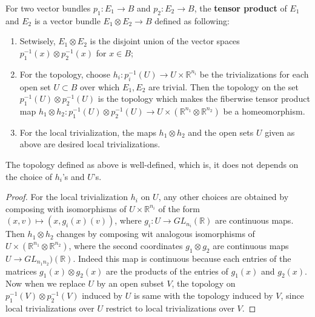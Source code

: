 \begin{defn} For two vector bundles $p_1:E_1\rightarrow B$ and $p_2:E_2\rightarrow B$, the \textbf{tensor product} of $E_1$ and $E_2$ is a vector bundle $E_1\otimes E_2\rightarrow B$ defined as following:
\begin{enumerate}
\item Setwisely, $E_1\otimes E_2$ is the disjoint union of the vector spaces $p_1^{-1}(x)\otimes p_2^{-1}(x)$ for $x\in B$;
\item For the topology, choose $h_i:p_i^{-1}(U)\rightarrow U\times \mathbb{R}^{n_i}$ be the trivializations for each open set $U\subset B$ over which $E_1, E_2$ are trivial. Then the topology on the set $p_1^{-1}(U)\otimes p_2^{-1}(U)$ is the topology which makes the fiberwise tensor product map $h_1\otimes h_2:p_1^{-1}(U)\otimes p_2^{-1}(U)\rightarrow U\times(\mathbb{R}^{n_1}\otimes \mathbb{R}^{n_2})$ be a homeomorphism.
\item For the local trivialization, the maps $h_1\otimes h_2$ and the open sets $U$ given as above are desired local trivializations.
\end{enumerate}
\end{defn}

\begin{prop} The topology defined as above is well-defined, which is, it does not depends on the choice of $h_i$'s and $U$'s.
\end{prop}
\begin{proof}
For the local trivialization $h_i$ on $U$, any other choices are obtained by composing with isomorphisms of $U\times \mathbb{R}^{n_i}$ of the form $(x,v)\mapsto (x,g_i(x)(v))$, where $g_i:U\rightarrow GL_{n_i}(\mathbb{R})$ are continuous maps. Then $h_1\otimes h_2$ changes by composing wit analogous isomorphisms of $U\times (\mathbb{R}^{n_1}\otimes \mathbb{R}^{n_2})$, where the second coordinates $g_1\otimes g_2$ are continuous maps $U\rightarrow GL_{n_1 n_2})(\mathbb{R})$. Indeed this map is continuous because each entries of the matrices $g_1(x)\otimes g_2(x)$ are the products of the entries of $g_1(x)$ and $g_2(x)$. Now when we replace $U$ by an open subset $V$, the topology on $p_1^{-1}(V)\otimes p_2^{-1}(V)$ induced by $U$ is same with the topology induced by $V$, since local trivializations over $U$ restrict to local trivializations over $V$.
\end{proof}

